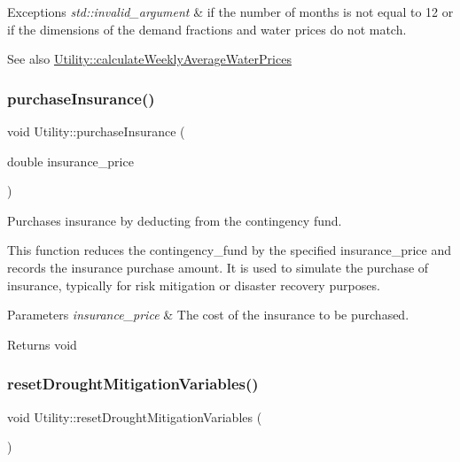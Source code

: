 \begin{DoxyExceptions}{Exceptions}
{\em std\+::invalid\+\_\+argument} & if the number of months is not equal to 12 or if the dimensions of the demand fractions and water prices do not match.\\
\hline
\end{DoxyExceptions}
\begin{DoxySeeAlso}{See also}
\mbox{\hyperlink{classUtility_a0189edb631c9596f094b15afeeb934fd}{Utility\+::calculate\+Weekly\+Average\+Water\+Prices}} 
\end{DoxySeeAlso}
\mbox{\label{classUtility_a97073e3d7a30275c639484b3158284fa}} 
\subsubsection{\texorpdfstring{purchase\+Insurance()}{purchaseInsurance()}}
{\footnotesize\ttfamily void Utility\+::purchase\+Insurance (\begin{DoxyParamCaption}\item[{double}]{insurance\+\_\+price }\end{DoxyParamCaption})}



Purchases insurance by deducting from the contingency fund. 

This function reduces the contingency\+\_\+fund by the specified insurance\+\_\+price and records the insurance purchase amount. It is used to simulate the purchase of insurance, typically for risk mitigation or disaster recovery purposes.


\begin{DoxyParams}{Parameters}
{\em insurance\+\_\+price} & The cost of the insurance to be purchased.\\
\hline
\end{DoxyParams}
\begin{DoxyReturn}{Returns}
void 
\end{DoxyReturn}
\mbox{\label{classUtility_af9ec9c2cb69166db021f03ce9ddf4d8e}} 
\subsubsection{\texorpdfstring{reset\+Drought\+Mitigation\+Variables()}{resetDroughtMitigationVariables()}}
{\footnotesize\ttfamily void Utility\+::reset\+Drought\+Mitigation\+Variables (\begin{DoxyParamCaption}{ }\end{DoxyParamCaption})}



